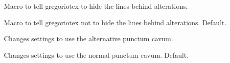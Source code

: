 Macro to tell gregoriotex to hide the lines behind alterations.

Macro to tell gregoriotex not to hide the lines behind alterations.
Default.

Changes settings to use the alternative punctum cavum.

Changes settings to use the normal punctum cavum.  Default.

